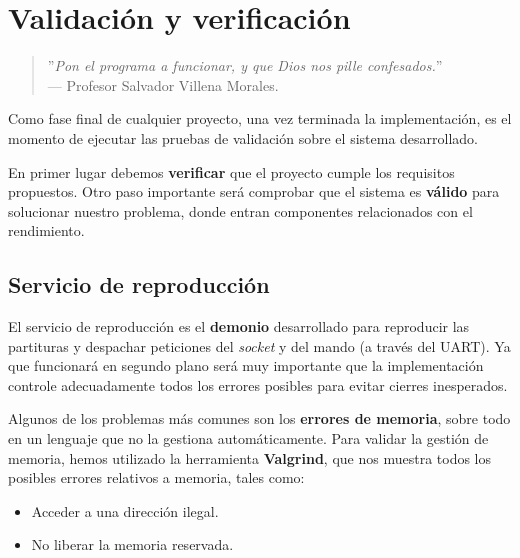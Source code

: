 \chapter{Validación y verificación}
\label{cap:capitulo6}

\smallskip

\begin{quote}
	\begin{flushright}
		\small ''\textit{Pon el programa a funcionar, y que Dios nos pille confesados.}'' \\
		--- Profesor Salvador Villena Morales.
	\end{flushright}
\end{quote}

\smallskip

Como fase final de cualquier proyecto, una vez terminada la implementación, es el momento de ejecutar las pruebas de validación sobre el sistema desarrollado.

En primer lugar debemos \textbf{verificar} que el proyecto cumple los requisitos propuestos. Otro paso importante será comprobar que el sistema es \textbf{válido} para solucionar nuestro problema, donde entran componentes relacionados con el rendimiento.

\newpage

\section{Servicio de reproducción}

El servicio de reproducción es el \textbf{demonio} desarrollado para reproducir las partituras y despachar peticiones del \textit{socket} y del mando (a través del \acrshort{UART}). Ya que funcionará en segundo plano será muy importante que la implementación controle adecuadamente todos los errores posibles para evitar cierres inesperados.

Algunos de los problemas más comunes son los \textbf{errores de memoria}, sobre todo en un lenguaje que no la gestiona automáticamente. Para validar la gestión de memoria, hemos utilizado la herramienta \textbf{Valgrind}, que nos muestra todos los posibles errores relativos a memoria, tales como:

\begin{itemize}
	\item Acceder a una dirección ilegal.
	\item No liberar la memoria reservada.
\end{itemize}

